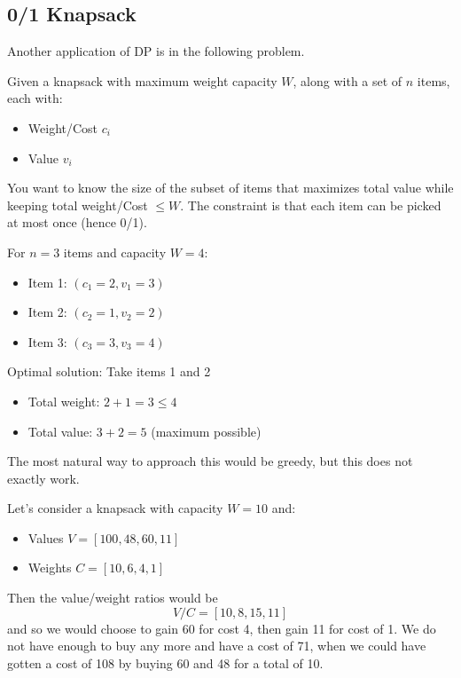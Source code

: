 \documentclass{article}
\begin{document}
  \subsection{0/1 Knapsack} 

    Another application of DP is in the following problem. 

    \begin{definition}[0/1 Knapsack]
      Given a knapsack with maximum weight capacity $W$, along with a set of $n$ items, each with:
      \begin{itemize}
        \item Weight/Cost $c_i$
        \item Value $v_i$
      \end{itemize}
      You want to know the size of the subset of items that maximizes total value while keeping total weight/Cost $\leq W$. The constraint is that each item can be picked at most once (hence 0/1). 
    \end{definition}

    \begin{example}
      For $n = 3$ items and capacity $W = 4$:
      \begin{itemize}
        \item Item 1: $(c_1 = 2, v_1 = 3)$
        \item Item 2: $(c_2 = 1, v_2 = 2)$
        \item Item 3: $(c_3 = 3, v_3 = 4)$
      \end{itemize}
      Optimal solution: Take items 1 and 2
      \begin{itemize}
        \item Total weight: $2 + 1 = 3 \leq 4$
        \item Total value: $3 + 2 = 5$ (maximum possible)
      \end{itemize}
    \end{example}

    The most natural way to approach this would be greedy, but this does not exactly work. 

    \begin{example}
      Let's consider a knapsack with capacity $W = 10$ and:
      \begin{itemize}
        \item Values $V = [100, 48, 60, 11]$
        \item Weights $C = [10, 6, 4, 1]$
      \end{itemize}
      Then the value/weight ratios would be 
      \begin{equation}
        V/C = [10, 8, 15, 11]
      \end{equation}
      and so we would choose to gain 60 for cost 4, then gain 11 for cost of 1. We do not have enough to buy any more and have a cost of 71, when we could have gotten a cost of 108 by buying 60 and 48 for a total of 10. 
    \end{example}
\end{document}
